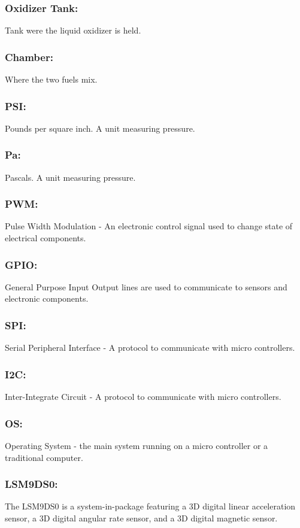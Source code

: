 \documentclass[10pt,draftclsnofoot,onecolumn,retainorgcmds]{IEEEtran}
\begin{document}
\subsubsection{\bf Oxidizer Tank:} Tank were the liquid oxidizer is held. 
\subsubsection{\bf Chamber:} Where the two fuels mix.
\subsubsection{\bf PSI:}Pounds per square inch. A unit measuring pressure. 
\subsubsection{\bf Pa:} Pascals. A unit measuring pressure.
\subsubsection{\bf PWM:} Pulse Width Modulation - An electronic control signal used to change state of electrical components.
\subsubsection{\bf GPIO:}  General Purpose Input Output lines are used to communicate to sensors and electronic components.
\subsubsection{\bf SPI:}  Serial Peripheral Interface - A protocol to communicate with micro controllers.
\subsubsection{\bf I2C:}  Inter-Integrate Circuit - A protocol to communicate with micro controllers.
\subsubsection{\bf OS:} Operating System - the main system running on a micro controller or a traditional computer.
\subsubsection{\bf LSM9DS0:} The LSM9DS0 is a system-in-package featuring a 3D digital linear acceleration sensor,  a 3D digital angular rate sensor, and a 3D digital magnetic sensor.
\end{document}

